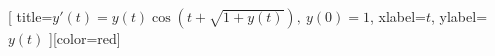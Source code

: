 \documentclass[a4paper, oneside]{oblivoir}
\begin{document}
\ExplSyntaxOn


[
    title={$y'(t)=y(t)\cos\left(t+\sqrt{1+y(t)}\right),\ y(0)=1$},
    xlabel=$t$,
    ylabel=$y(t)$
][color=red]

\ExplSyntaxOff
\end{document}
